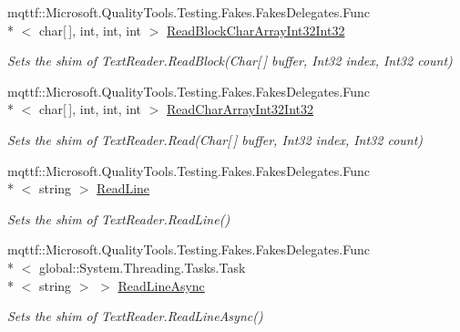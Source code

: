 \begin{DoxyCompactItemize}
mqttf\-::\-Microsoft.\-Quality\-Tools.\-Testing.\-Fakes.\-Fakes\-Delegates.\-Func\\*
$<$ char\mbox{[}$\,$\mbox{]}, int, int, int $>$ \hyperlink{class_system_1_1_i_o_1_1_fakes_1_1_shim_text_reader_a15b8e236291d017ee0d9f1482fe3f7da}{Read\-Block\-Char\-Array\-Int32\-Int32}
\begin{DoxyCompactList}\small\item\em Sets the shim of Text\-Reader.\-Read\-Block(\-Char\mbox{[}$\,$\mbox{]} buffer, Int32 index, Int32 count)\end{DoxyCompactList}\item 
mqttf\-::\-Microsoft.\-Quality\-Tools.\-Testing.\-Fakes.\-Fakes\-Delegates.\-Func\\*
$<$ char\mbox{[}$\,$\mbox{]}, int, int, int $>$ \hyperlink{class_system_1_1_i_o_1_1_fakes_1_1_shim_text_reader_a2fa5ba0fba28b5c2f6e13a512d435965}{Read\-Char\-Array\-Int32\-Int32}
\begin{DoxyCompactList}\small\item\em Sets the shim of Text\-Reader.\-Read(\-Char\mbox{[}$\,$\mbox{]} buffer, Int32 index, Int32 count)\end{DoxyCompactList}\item 
mqttf\-::\-Microsoft.\-Quality\-Tools.\-Testing.\-Fakes.\-Fakes\-Delegates.\-Func\\*
$<$ string $>$ \hyperlink{class_system_1_1_i_o_1_1_fakes_1_1_shim_text_reader_aefa1dddaef8a14e287eb399f0ebf0fa0}{Read\-Line}
\begin{DoxyCompactList}\small\item\em Sets the shim of Text\-Reader.\-Read\-Line()\end{DoxyCompactList}\item 
mqttf\-::\-Microsoft.\-Quality\-Tools.\-Testing.\-Fakes.\-Fakes\-Delegates.\-Func\\*
$<$ global\-::\-System.\-Threading.\-Tasks.\-Task\\*
$<$ string $>$ $>$ \hyperlink{class_system_1_1_i_o_1_1_fakes_1_1_shim_text_reader_a7a05488d7a6d02c9ed0e844fb25e182a}{Read\-Line\-Async}
\begin{DoxyCompactList}\small\item\em Sets the shim of Text\-Reader.\-Read\-Line\-Async()\end{DoxyCompactList}\item 

\end{DoxyCompactItemize}
